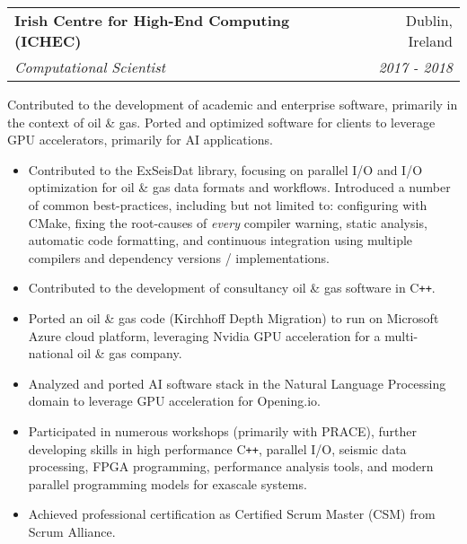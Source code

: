 \documentclass[11pt]{article}
\makeatletter
\newenvironment{resumeSubSectionHeader}{
    \par
    \begin{tabular*}{\textwidth}{l@{\extracolsep{\fill}}r}
    \par
} {
    \end{tabular*}
    \par
}
\newenvironment{resumeSubSectionBody}{
    \par
    \vspace{-0.4\parskip}
    \begin{small}
    \par
} {
    \par
    \end{small}
    \par
}
\newenvironment{resumeItemize}{
    \vspace{-0.5\baselineskip}
    \begin{itemize}
} {
    \end{itemize}
}
\makeatother
\begin{document}
\newpage
\begin{resumeSubSectionHeader}

    \textbf{Irish Centre for High-End Computing (ICHEC)} & Dublin, Ireland \\
    \emph{Computational Scientist}                 & \emph{2017 - 2018}

\end{resumeSubSectionHeader}
\begin{resumeSubSectionBody}

    Contributed to the development of academic and enterprise software,
    primarily in the context of oil \& gas.
    Ported and optimized software for clients to leverage GPU accelerators,
    primarily for AI applications.

    \begin{resumeItemize}
        \item
            Contributed to the ExSeisDat library, focusing on parallel I/O
            and I/O optimization for oil \& gas data formats and workflows.
            Introduced a number of common best-practices, including but not
            limited to: configuring with  CMake, fixing the root-causes of
            {\it every} compiler warning, static analysis, automatic code
            formatting, and continuous integration using multiple compilers and
            dependency versions / implementations.

        \item
            Contributed to the development of consultancy oil \& gas software in
            C\verb!++!.

        \item
            Ported an oil \& gas code (Kirchhoff Depth Migration) to run on
            Microsoft Azure cloud platform, leveraging Nvidia GPU acceleration
            for a multi-national oil \& gas company.

        \item
            Analyzed and ported AI software stack in the Natural Language
            Processing domain to leverage GPU acceleration for Opening.io.

        \item
            Participated in numerous workshops (primarily with PRACE), further
            developing skills in high performance C\verb!++!, parallel I/O,
            seismic data processing, FPGA programming, performance analysis
            tools, and modern parallel programming models for exascale systems.

        \item
            Achieved professional certification as Certified Scrum Master (CSM)
            from Scrum Alliance.
    \end{resumeItemize}

\end{resumeSubSectionBody}
\end{document}
